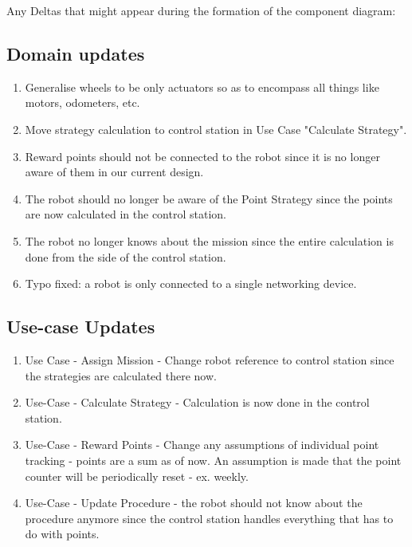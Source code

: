 
Any Deltas that might appear during the formation of the component diagram:

\subsection*{Domain updates}
\begin{enumerate}
    \item Generalise wheels to be only actuators so as to encompass all things like motors, odometers, etc.
    \item Move strategy calculation to control station in Use Case "Calculate Strategy".
    \item Reward points should not be connected to the robot since it is no longer aware of them in our current design.
    \item The robot should no longer be aware of the Point Strategy since the points are now calculated in the control station.
    \item The robot no longer knows about the mission since the entire calculation is done from the side of the control station.
    \item Typo fixed: a robot is only connected to a single networking device.
\end{enumerate}

\subsection*{Use-case Updates}
\begin{enumerate}
    \item Use Case - Assign Mission - Change robot reference to control station since the strategies are calculated there now.
    \item Use-Case - Calculate Strategy - Calculation is now done in the control station.
    \item Use-Case - Reward Points - Change any assumptions of individual point tracking - points are a sum as of now. An assumption is made that the point counter will be periodically reset - ex. weekly.
    \item Use-Case - Update Procedure - the robot should not know about the procedure anymore since the control station handles everything that has to do with points. 
\end{enumerate}


    